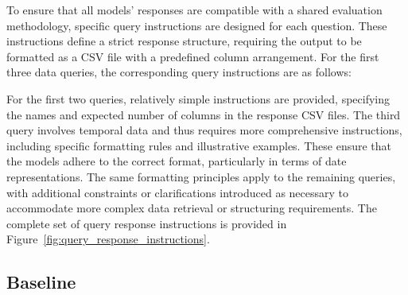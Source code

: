 \documentclass{DESSThesis}
\begin{document}
To ensure that all models' responses are compatible with a shared evaluation methodology, specific query instructions are designed for each question. These instructions define a strict response structure, requiring the output to be formatted as a CSV file with a predefined column arrangement. For the first three data queries, the corresponding query instructions are as follows:

\begin{figure}[ht]
    \centering
\end{figure}

For the first two queries, relatively simple instructions are provided, specifying the names and expected number of columns in the response CSV files. The third query involves temporal data and thus requires more comprehensive instructions, including specific formatting rules and illustrative examples. These ensure that the models adhere to the correct format, particularly in terms of date representations. The same formatting principles apply to the remaining queries, with additional constraints or clarifications introduced as necessary to accommodate more complex data retrieval or structuring requirements. The complete set of query response instructions is provided in Figure~\ref{fig:query_response_instructions}.

\subsection{Baseline}
\end{document}
